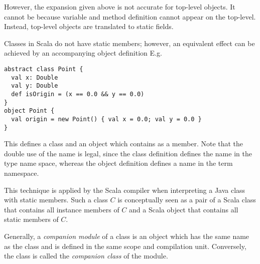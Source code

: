 However, the expansion given above is not accurate for top-level
objects. It cannot be because variable and method definition cannot
appear on the top-level. Instead, top-level objects are translated to
static fields. 

\example
Classes in Scala do not have static members; however, an equivalent
effect can be achieved by an accompanying object definition
E.g.
\begin{lstlisting}
abstract class Point {
  val x: Double 
  val y: Double 
  def isOrigin = (x == 0.0 && y == 0.0) 
}
object Point {
  val origin = new Point() { val x = 0.0; val y = 0.0 }
}
\end{lstlisting}
This defines a class  and an object  which
contains  as a member.  Note that the double use of the
name  is legal, since the class definition defines the
name  in the type name space, whereas the object
definition defines a name in the term namespace. 

This technique is applied by the Scala compiler when interpreting a
Java class with static members. Such a class $C$ is conceptually seen
as a pair of a Scala class that contains all instance members of $C$
and a Scala object that contains all static members of $C$.

Generally, a {\em companion module} of a class is an object which has
the same name as the class and is defined in the same scope and
compilation unit. Conversely, the class is called the {\em companion class}
of the module.\label{def:companion}




